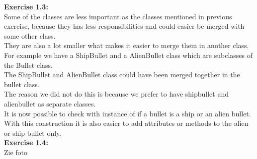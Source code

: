 \documentclass[10pt]{article}
\begin{document}
 \textbf{Exercise 1.3:} \\
Some of the classes are less important as the classes mentioned in previous exercise, because they has less responsibilities and could easier be merged with some other class.\\
They are also a lot smaller what makes it easier to merge them in another class. For example we have a ShipBullet and a AlienBullet class which are subclasses of the Bullet class. \\
 The ShipBullet and AlienBullet class could have been merged together in the bullet class. \\
The reason we did not do this is because we prefer to have shipbullet and alienbullet as separate classes. \\
It is now possible to check with instance of if a bullet is a ship or an alien bullet. \\
With this construction it is also easier to add attributes or methods to the alien or ship bullet only.\\

 \textbf{Exercise 1.4:} \\
Zie foto
\end{document}
